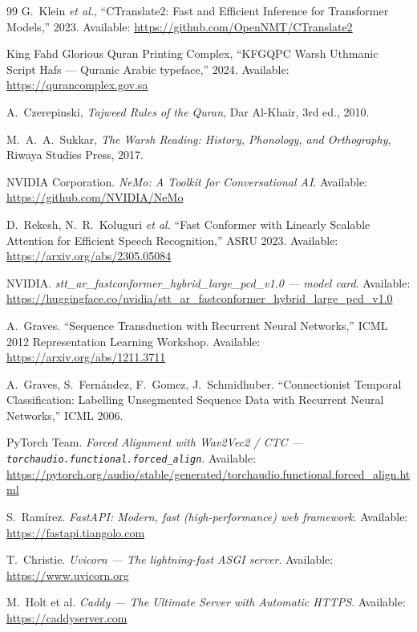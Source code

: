 \begin{thebibliography}{99}
G.~Klein \textit{et al.},
``CTranslate2: Fast and Efficient Inference for Transformer Models,''
2023. Available: \url{https://github.com/OpenNMT/CTranslate2}

King Fahd Glorious Quran Printing Complex,
``KFGQPC Warsh Uthmanic Script Hafs --- Quranic Arabic typeface,''
2024. Available: \url{https://qurancomplex.gov.sa}

A.~Czerepinski,
\textit{Tajweed Rules of the Quran},
Dar Al-Khair, 3rd ed., 2010.

M.~A.~A.~Sukkar,
\textit{The Warsh Reading: History, Phonology, and Orthography},
Riwaya Studies Press, 2017.

NVIDIA Corporation. \emph{NeMo: A Toolkit for Conversational AI}.
Available: \url{https://github.com/NVIDIA/NeMo}

D.~Rekesh, N.~R.~Koluguri \textit{et al.}
``Fast Conformer with Linearly Scalable Attention for Efficient Speech
Recognition,'' ASRU 2023.
Available: \url{https://arxiv.org/abs/2305.05084}

NVIDIA. \emph{stt\_ar\_fastconformer\_hybrid\_large\_pcd\_v1.0 --- model card}.
Available: \url{https://huggingface.co/nvidia/stt_ar_fastconformer_hybrid_large_pcd_v1.0}

A.~Graves. ``Sequence Transduction with Recurrent Neural Networks,''
ICML 2012 Representation Learning Workshop.
Available: \url{https://arxiv.org/abs/1211.3711}

A.~Graves, S.~Fern\'andez, F.~Gomez, J.~Schmidhuber.
``Connectionist Temporal Classification: Labelling Unsegmented Sequence
Data with Recurrent Neural Networks,'' ICML 2006.

PyTorch Team. \emph{Forced Alignment with Wav2Vec2 / CTC ---
\texttt{torchaudio.functional.forced\_align}}.
Available: \url{https://pytorch.org/audio/stable/generated/torchaudio.functional.forced_align.html}

S.~Ram\'irez. \emph{FastAPI: Modern, fast (high-performance) web framework}.
Available: \url{https://fastapi.tiangolo.com}

T.~Christie. \emph{Uvicorn --- The lightning-fast ASGI server}.
Available: \url{https://www.uvicorn.org}

M.~Holt et al. \emph{Caddy --- The Ultimate Server with Automatic HTTPS}.
Available: \url{https://caddyserver.com}


\end{thebibliography}
